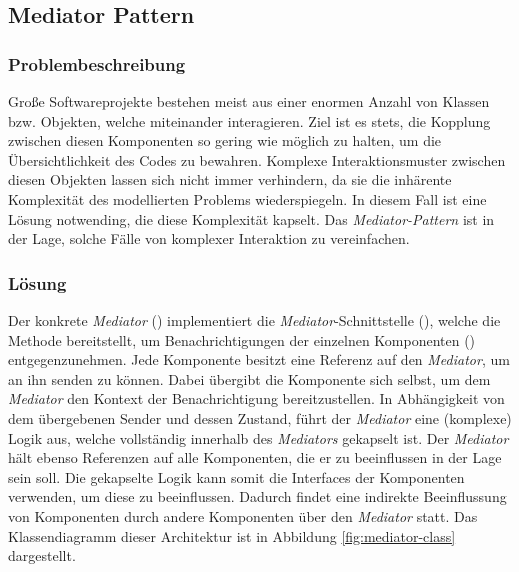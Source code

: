 \subsection{Mediator Pattern}


\subsubsection*{Problembeschreibung}

Große Softwareprojekte bestehen meist aus einer enormen Anzahl von Klassen bzw. Objekten, welche miteinander interagieren. Ziel ist es stets, die Kopplung zwischen diesen Komponenten so gering wie möglich zu halten, um die Übersichtlichkeit des Codes zu bewahren. Komplexe Interaktionsmuster zwischen diesen Objekten lassen sich nicht immer verhindern, da sie die inhärente Komplexität des modellierten Problems wiederspiegeln. In diesem Fall ist eine Lösung notwending, die diese Komplexität kapselt. Das \emph{Mediator-Pattern} ist in der Lage, solche Fälle von komplexer Interaktion zu vereinfachen. \cite{gamma_design_1995}

\subsubsection*{Lösung}

Der konkrete \emph{Mediator} () implementiert die \emph{Mediator}-Schnittstelle (), welche die Methode  bereitstellt, um Benachrichtigungen der einzelnen Komponenten () entgegenzunehmen. Jede Komponente besitzt eine Referenz auf den \emph{Mediator}, um  an ihn senden zu können. Dabei übergibt die Komponente sich selbst, um dem \emph{Mediator} den Kontext der Benachrichtigung bereitzustellen. In Abhängigkeit von dem übergebenen Sender und dessen Zustand, führt der \emph{Mediator} eine (komplexe) Logik aus, welche vollständig innerhalb des \emph{Mediators} gekapselt ist. Der \emph{Mediator} hält ebenso Referenzen auf alle Komponenten, die er zu beeinflussen in der Lage sein soll. Die gekapselte Logik kann somit die Interfaces der Komponenten verwenden, um diese zu beeinflussen. Dadurch findet eine indirekte Beeinflussung von Komponenten durch andere Komponenten über den \emph{Mediator} statt. Das Klassendiagramm dieser Architektur ist in Abbildung \ref{fig:mediator-class} dargestellt.

